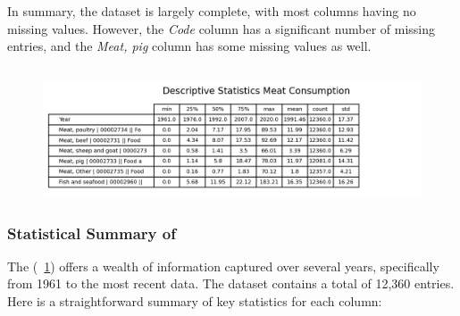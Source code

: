             In summary, the dataset is largely complete, with most columns having no missing values. However, the \textit{Code} column has a significant number of missing entries, and the \textit{Meat, pig} column has some missing values as well.

        \subsection{\duExploreTheData}
            \begin{figure}[H]
                \centering
                \includegraphics[scale=1]{images/du_meat_consumption_summary}
                \caption{}
                \label{fig:du-meat-summary}
            \end{figure}

            \subsubsection{Statistical Summary of {\dsMeat}}

                The {\dsMeat} (\figurename~\ref{fig:du-meat-summary}) offers a wealth of information captured over several years, specifically from 1961 to the most recent data. The dataset contains a total of 12,360 entries. Here is a straightforward summary of key statistics for each column:


